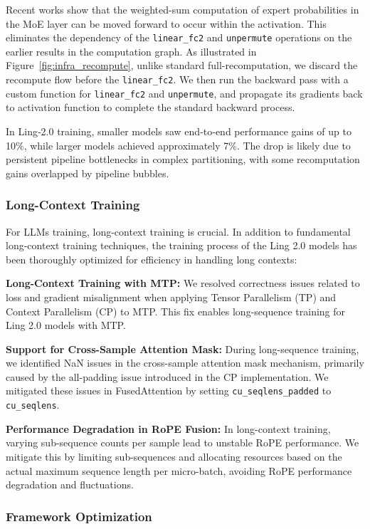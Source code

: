 \documentclass[table]{gtech}
\theoremstyle{definition}
\begin{document}
Recent works show that the weighted-sum computation of expert probabilities in the MoE layer can be moved forward to occur within the activation. This eliminates the dependency of the \verb|linear_fc2| and \verb|unpermute| operations on the earlier results in the computation graph.
As illustrated in Figure~\ref{fig:infra_recompute}, unlike standard full-recomputation, we discard the recompute flow before the \verb|linear_fc2|. We then run the backward pass with a custom function for \verb|linear_fc2| and \verb|unpermute|, and propagate its gradients back to activation function to complete the standard backward process.

In Ling‑2.0 training, smaller models saw end‑to‑end performance gains of up to 10\%, while larger models achieved approximately 7\%. The drop is likely due to persistent pipeline bottlenecks in complex partitioning, with some recomputation gains overlapped by pipeline bubbles.

\subsubsection{Long-Context Training}

For LLMs training, long-context training is crucial. In addition to fundamental long-context training techniques, the training process of the Ling 2.0 models has been thoroughly optimized for efficiency in handling long contexts:

\textbf{Long-Context Training with MTP:} We resolved correctness issues related to loss and gradient misalignment when applying Tensor Parallelism (TP) and Context Parallelism (CP) to MTP. This fix enables long-sequence training for Ling 2.0 models with MTP.

\textbf{Support for Cross-Sample Attention Mask:} During long-sequence training, we identified NaN issues in the cross-sample attention mask mechanism, primarily caused by the all-padding issue introduced in the CP implementation. We mitigated these issues in FusedAttention by setting \verb|cu_seqlens_padded| to \verb|cu_seqlens|.

\textbf{Performance Degradation in RoPE Fusion:} In long-context training, varying sub-sequence counts per sample lead to unstable RoPE performance. We mitigate this by limiting sub-sequences and allocating resources based on the actual maximum sequence length per micro-batch, avoiding RoPE performance degradation and fluctuations.

\subsubsection{Framework Optimization}
\end{document}
